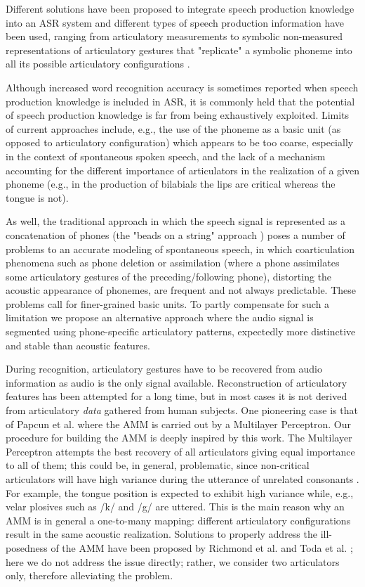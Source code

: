 \documentclass[10pt]{article}
\begin{document}
Different solutions have been proposed to integrate speech production knowledge into an ASR system
and different types of speech production information have been used, ranging from articulatory
measurements \cite{zlokarnik,stephenson,wrench} to symbolic non-measured representations of
articulatory gestures that "replicate" a symbolic phoneme into all its possible articulatory
configurations \cite{richardson, livescu}.   

Although increased word recognition accuracy is sometimes reported when speech production
knowledge is included in ASR, it is commonly held that the potential of speech production
knowledge is far from being exhaustively exploited. Limits of current approaches include, e.g.,
the use of the phoneme as a basic unit (as opposed to articulatory configuration)
which appears to be too coarse, especially in the context of spontaneous spoken speech,
and the lack of a mechanism accounting for the different importance of articulators in the
realization of a given phoneme (e.g., in the production of bilabials the lips are critical whereas
the tongue is not).

As well, the traditional approach in which the speech signal is represented as a concatenation of phones 
(the "beads on a string" approach \cite{ostendorf}) poses a number of problems to an accurate modeling of
spontaneous speech, in which coarticulation phenomena such as phone deletion or assimilation (where a phone assimilates some articulatory gestures of the preceding/following phone),
distorting the acoustic appearance of phonemes, are frequent and not always predictable. These problems
call for finer-grained basic units. To partly compensate for such a limitation we propose
an alternative approach where the audio signal is segmented using phone-specific articulatory patterns,
expectedly more distinctive and stable than acoustic features.

During recognition, articulatory gestures have to be recovered 
from audio information as audio is the only signal available.
Reconstruction of articulatory features has been attempted for a long
time, but in most cases it is not derived from articulatory \emph{data}
gathered from human subjects. One pioneering case is that of Papcun
et al. \cite{papcun} where the AMM is carried out by a Multilayer Perceptron.
Our procedure for building the AMM is deeply inspired by this work.
The Multilayer Perceptron attempts the best recovery of all articulators giving equal importance
to all of them; this could be, in general, problematic, since non-critical articulators will have
high variance during the utterance of unrelated consonants \cite{papcun,rose}.
For example, the tongue position is expected to exhibit high variance while, e.g., velar plosives
such as /k/ and /g/ are uttered. This is the main reason why an AMM is in general a one-to-many mapping: different articulatory configurations result in the same acoustic realization. Solutions to properly address the ill-posedness
of the AMM have been proposed by Richmond et al. \cite{richmond} and Toda et al. \cite{toda}; here we do
not address the issue directly; rather, we consider two articulators only, therefore alleviating the problem.
\end{document}

